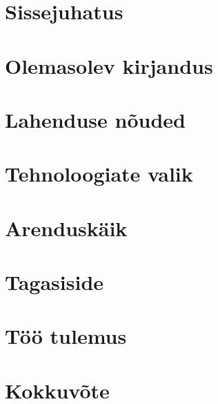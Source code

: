 \chapter{Sissejuhatus}


\chapter{Olemasolev kirjandus}


\chapter{Lahenduse nõuded}


\chapter{Tehnoloogiate valik}


\chapter{Arenduskäik}


\chapter{Tagasiside}


\chapter{Töö tulemus}


\chapter{Kokkuvõte}


